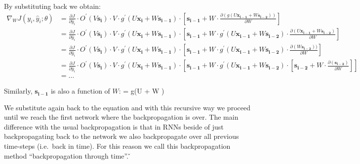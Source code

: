 By substituting back we obtain:
{\setlength{\jot}{5pt}
\begin{align*}
\nabla_W J(y_i, \hat{y}_i ; \theta) & = \frac{\partial J}{\partial \hat{y}_i} \cdot O^\prime(V \boldsymbol{s_i})
\cdot V \cdot g^\prime(U \boldsymbol{x_i} + W \boldsymbol{s_{i-1}}) \cdot \left[ \boldsymbol{s_{i-1}} + W
\cdot \frac{\partial (g(U \boldsymbol{x_{i-1}} + W \boldsymbol{s_{i-2}}))} {\partial W} \right] \\
& = \frac{\partial J}{\partial \hat{y}_i} \cdot O^\prime(V\boldsymbol{s_i})
\cdot V \cdot g^\prime(U\boldsymbol{x_i} + W \boldsymbol{s_{i-1}})
\cdot \left[\boldsymbol{s_{i-1}} + W \cdot g^\prime (U\boldsymbol{x_{i-1}} + W \boldsymbol{s_{i-2}})
\cdot \frac{\partial (U\boldsymbol{x_{i-1}} + W \boldsymbol{s_{i-2}})} {\partial W} \right] \\
&= \frac{\partial J}{\partial \hat{y}_i} \cdot O^\prime(V\boldsymbol{s_i}) \cdot V
\cdot g^\prime(U\boldsymbol{x_i} + W \boldsymbol{s_{i-1}}) \cdot \left[\boldsymbol{s_{i-1}} + W \cdot g^\prime
(U \boldsymbol{x_{i-1}} + W \boldsymbol{s_{i-2}}) \cdot \frac{\partial (W \boldsymbol{s_{i-2}}))} {\partial W} \right] \\
&= \frac{\partial J}{\partial \hat{y}_i} \cdot O^\prime(V \boldsymbol{s_i}) \cdot V
\cdot g^\prime(U \boldsymbol{x_i} + W \boldsymbol{s_{i-1}}) \cdot \left[\boldsymbol{s_{i-1}} + W \cdot g^\prime
(U \boldsymbol{x_{i-1}} + W \boldsymbol{s_{i-2}}) \cdot \left[\boldsymbol{s_{i-2}} + W
\cdot \frac{\partial(\boldsymbol{s_{i-2}})} {\partial W} \right] \right] \\ &= \ldots
\end{align*}}

Similarly, $\boldsymbol{s_{i-1}}$ is also a function of $W$:
\bse
{}= g(U  + W )
\ese

We substitute again back to the equation and with this recursive way we proceed until we reach the first network
where the backpropagation is over. The main difference with the usual backpropagation is that in RNNs beside of just
backpropagating back to the network we also backpropagate over all previous time-steps (i.e.\ back in time). For this
reason we call this backpropagation method ``backpropagation through time''. \v

